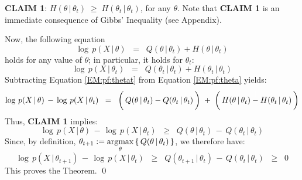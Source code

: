 \vskip 0.5cm
\noindent
\textbf{CLAIM 1}:\;\; $H(\theta\,|\,\theta_{t}) \;\geq\; H(\theta_{t}\,|\,\theta_{t})$,\;\; for any $\theta$.
\vskip 0.3cm
\noindent
Note that \textbf{CLAIM 1} is an immediate consequence of Gibbs' Inequality (see Appendix).

\vskip 0.3cm
\noindent
Now, the following equation
\begin{equation}
\label{EM:pf:theta}
\log\,p(X\,|\,\theta)
\;\; = \;\;
Q(\theta\,|\,\theta_{t}) + H(\theta\,|\,\theta_{t})
\end{equation}
holds for any value of $\theta$; in particular, it holds for $\theta_{t}$:
\begin{equation}
\label{EM:pf:thetat}
\log\,p(X\,|\,\theta_{t})
\;\; = \;\;
Q(\theta_{t}\,|\,\theta_{t}) + H(\theta_{t}\,|\,\theta_{t})
\end{equation}
Subtracting Equation \eqref{EM:pf:thetat} from Equation \eqref{EM:pf:theta} yields:
\begin{equation}
\log\,p(X\,|\,\theta) \,-\, \log\,p(X\,|\,\theta_{t})
\;\; = \;\;
\left(\,Q(\theta\,|\,\theta_{t}) \overset{{\color{white}\vert}}{-} Q(\theta_{t}\,|\,\theta_{t})\,\right)
\;+\;
\left(\,H(\theta\,|\,\theta_{t}) \overset{{\color{white}\vert}}{-} H(\theta_{t}\,|\,\theta_{t})\,\right)
\end{equation}
Thus, \textbf{CLAIM 1} implies:
\begin{equation}
\log\,p(X\,|\,\theta) \,-\, \log\,p(X\,|\,\theta_{t})
\;\; \geq \;\;
Q(\theta\,|\,\theta_{t}) \,-\, Q(\theta_{t}\,|\,\theta_{t})
\end{equation}
Since, by definition, $\theta_{t+1} := \underset{\theta}{\textnormal{argmax}}\left\{\,Q(\theta\,|\,\theta_{t})\,\right\}$,
we therefore have:
\begin{equation}
\log\,p(X\,|\,\theta_{t+1}) \,-\, \log\,p(X\,|\,\theta_{t})
\;\; \geq \;\;
Q(\theta_{t+1}\,|\,\theta_{t}) \,-\, Q(\theta_{t}\,|\,\theta_{t})
\;\; \geq \;\;
0
\end{equation}
This proves the Theorem.  \qed

